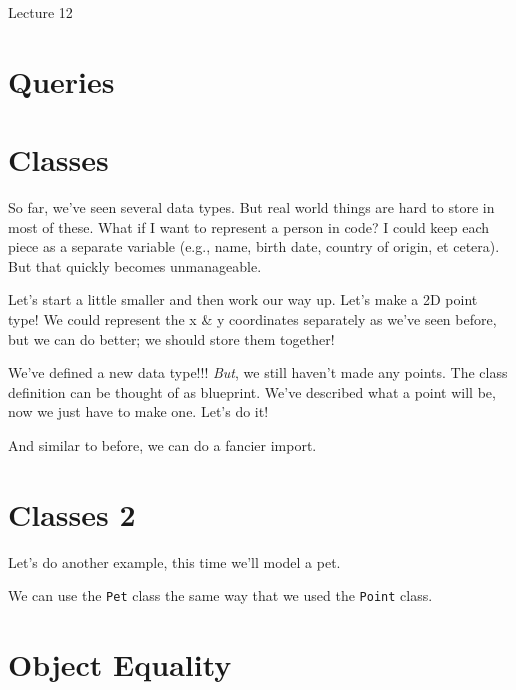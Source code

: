 \documentclass[12pt]{article}
\begin{document}
\begin{center}
   \LARGE Lecture 12
\end{center}

\section*{Queries}

\section{Classes}

So far, we've seen several data types.  But real world things are hard to store
in most of these.  What if I want to represent a person in code?  I could keep
each piece as a separate variable (e.g., name, birth date, country of origin,
et cetera).  But that quickly becomes unmanageable.

Let's start a little smaller and then work our way up.  Let's make a 2D point
type!  We could represent the x \& y coordinates separately as we've seen
before, but we can do better; we should store them together!



\noindent
We've defined a new data type!!!  \emph{But}, we still haven't made any points.
The class definition can be thought of as blueprint.  We've described what a
point will be, now we just have to make one.  Let's do it!



\noindent
And similar to before, we can do a fancier import.



\section{Classes 2}

Let's do another example, this time we'll model a pet.

\newpage


\noindent
We can use the \lstinline{Pet} class the same way that we used the
\lstinline{Point} class.



\section{Object Equality}
\end{document}
